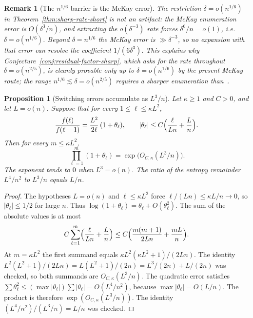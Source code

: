 \documentclass[11pt]{article}
\newtheorem{proposition}[theorem]{Proposition}
\newtheorem{remark}[theorem]{Remark}
\begin{document}
\begin{remark}[The \(n^{1/6}\) barrier is the McKay error]
\label{rem:n16-barrier}
The restriction \(\delta=o(n^{1/6})\) in Theorem~\ref{thm:sharp-rate-short} is
not an artifact: the McKay enumeration error is \(O(\delta^3/n)\), and extracting
the \(o(\delta^{-3})\) rate forces \(\delta^6/n=o(1)\), i.e.\ \(\delta=o(n^{1/6})\).
Beyond \(\delta=n^{1/6}\) the McKay error is \(\gg\delta^{-3}\), so no expansion
with that error can resolve the coefficient \(1/(6\delta^3)\). This explains why
Conjecture~\ref{conj:residual-factor-sharp}, which asks for the rate throughout
\(\delta=o(n^{2/5})\), is cleanly provable only up to \(\delta=o(n^{1/6})\) by the
present McKay route; the range \(n^{1/6}\lesssim\delta=o(n^{2/5})\) requires a
sharper enumeration than~\cite[Theorem~14]{Gao21}.
\end{remark}

\begin{proposition}[Switching errors accumulate as \(L^3/n\)]
\label{prop:switching-accumulation}
Let \(\kappa\ge 1\) and \(C>0\), and let \(L=o(n)\).
Suppose that for every \(1\le\ell\le\kappa L^2\),
\[
\frac{f(\ell)}{f(\ell-1)}
=
\frac{L^2}{2\ell}\,(1+\theta_\ell),
\qquad
|\theta_\ell|
\le
C\Bigl(\frac{\ell}{Ln}+\frac{L}{n}\Bigr).
\]
Then for every \(m\le\kappa L^2\),
\[
\prod_{\ell=1}^{m}(1+\theta_\ell)
=
\exp\bigl(O_{C,\kappa}(L^3/n)\bigr).
\]
The exponent tends to \(0\) when \(L^3=o(n)\).
The ratio of the entropy remainder \(L^4/n^2\) to \(L^3/n\) equals \(L/n\).
\end{proposition}

\begin{proof}
The hypotheses \(L=o(n)\) and \(\ell\le\kappa L^2\) force
\(\ell/(Ln)\le\kappa L/n\to 0\), so \(|\theta_\ell|\le 1/2\) for large \(n\).
Thus \(\log(1+\theta_\ell)=\theta_\ell+O(\theta_\ell^2)\).
The sum of the absolute values is at most
\[
C\sum_{\ell=1}^{m}\Bigl(\frac{\ell}{Ln}+\frac{L}{n}\Bigr)
\le
C\Bigl(\frac{m(m+1)}{2Ln}+\frac{mL}{n}\Bigr).
\]
At \(m=\kappa L^2\) the first summand equals
\(\kappa L^2(\kappa L^2+1)/(2Ln)\).
The identity
\(L^2(L^2+1)/(2Ln)=L(L^2+1)/(2n)=L^3/(2n)+L/(2n)\)
was checked, so both summands are \(O_{C,\kappa}(L^3/n)\).
The quadratic error satisfies
\(\sum\theta_\ell^2\le(\max|\theta_\ell|)\sum|\theta_\ell|=O(L^4/n^2)\),
because \(\max|\theta_\ell|=O(L/n)\).
The product is therefore \(\exp(O_{C,\kappa}(L^3/n))\).
The identity \((L^4/n^2)/(L^3/n)=L/n\) was checked.
\end{proof}
\end{document}
